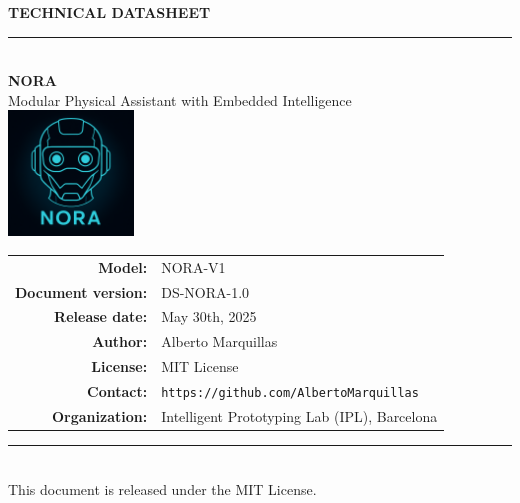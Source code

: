 \thispagestyle{empty}  %
\vspace*{1.5cm}

\begin{center}
	{\LARGE\bfseries TECHNICAL DATASHEET}\\[0.5cm]
	\rule{0.75\textwidth}{0.5pt}\\[1.5cm]
	
	{\Huge\bfseries NORA}\\[0.4cm]
	{\Large Modular Physical Assistant with Embedded Intelligence}\\[1.5cm]
	
	\includegraphics[width=0.25\textwidth]{images/nora-hero.png}\\[1.5cm]  %
	
	\begin{tabular}{rl}
		\textbf{Model:} & NORA-V1 \\
		\textbf{Document version:} & DS-NORA-1.0 \\
		\textbf{Release date:} & May 30th, 2025 \\
		\textbf{Author:} & Alberto Marquillas \\
		\textbf{License:} & MIT License \\
		\textbf{Contact:} & \texttt{https://github.com/AlbertoMarquillas} \\
		\textbf{Organization:} & Intelligent Prototyping Lab (IPL), Barcelona
	\end{tabular}
	
	\vfill
	\rule{0.75\textwidth}{0.5pt}\\
	{\small This document is released under the MIT License.}
\end{center}

\newpage
